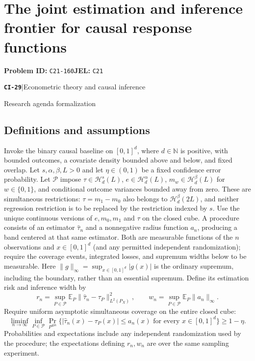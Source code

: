 \documentclass[11pt,a4paper]{article}
\newcommand{\E}{\mathbb E}
\newcommand{\N}{\mathbb N}
\newcommand{\entrymeta}[3]{{\sffamily\small\color{muted}\textbf{\texttt{#1}}\quad|\quad #2\par #3\par}}
\begin{document}
\section*{The joint estimation and inference frontier for causal response functions}
\textbf{Problem ID:} \texttt{C21-160}\quad \textbf{JEL:} \texttt{C21}\par
\label{problem:OP-0508}
\label{beyond:CI-29}
\entrymeta{CI-29}{Econometric theory and causal inference}{Research agenda formalization}
\subsection*{Definitions and assumptions}
Invoke the binary causal baseline on $[0,1]^d$, where $d\in\N$ is positive, with bounded outcomes, a covariate density bounded above and below, and fixed overlap. Let $s,\alpha,\beta,L>0$ and let $\eta\in(0,1)$ be a fixed confidence error probability. Let $\mathcal P$ impose $\tau\in\mathcal H_d^s(L)$, $e\in\mathcal H_d^\alpha(L)$, $m_w\in\mathcal H_d^\beta(L)$ for $w\in\{0,1\}$, and conditional outcome variances bounded away from zero. These are simultaneous restrictions: $\tau=m_1-m_0$ also belongs to $\mathcal H_d^\beta(2L)$, and neither regression restriction is to be replaced by the restriction indexed by $s$. Use the unique continuous versions of $e,m_0,m_1$ and $\tau$ on the closed cube. A procedure consists of an estimator $\widehat\tau_n$ and a nonnegative radius function $a_n$, producing a band centered at that same estimator. Both are measurable functions of the $n$ observations and $x\in[0,1]^d$ (and any permitted independent randomization); require the coverage events, integrated losses, and supremum widths below to be measurable. Here $\|g\|_\infty=\sup_{x\in[0,1]^d}|g(x)|$ is the ordinary supremum, including the boundary, rather than an essential supremum. Define its estimation risk and inference width by
\[
 r_n=\sup_{P\in\mathcal P}\E_P\|\widehat\tau_n-\tau_P\|_{L^2(P_X)}^2,
 \qquad w_n=\sup_{P\in\mathcal P}\E_P\|a_n\|_\infty.
\]
Require uniform asymptotic simultaneous coverage on the entire closed cube:
\[
 \liminf_{n\to\infty}\inf_{P\in\mathcal P}
 \Pr_{P^{\otimes n}}\{ |\widehat\tau_n(x)-\tau_P(x)|\leq a_n(x)
                    \text{ for every }x\in[0,1]^d\}\geq1-\eta.
\]
Probabilities and expectations include any independent randomization used by the procedure; the expectations defining $r_n,w_n$ are over the same sampling experiment.
\end{document}
